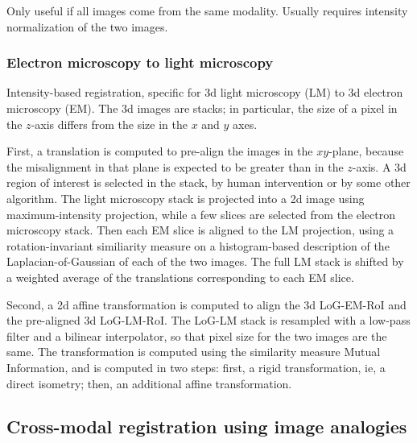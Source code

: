 \documentclass[11pt]{article} %
\begin{document}
Only useful if all images come from the same modality. Usually requires intensity normalization of the two images.
    \subsubsection{Electron microscopy to light microscopy \cite{acosta:intensity}}
Intensity-based registration, specific for 3d light microscopy (LM) to 3d electron microscopy (EM). The 3d images are stacks; in particular, the size of a pixel in the $z$-axis differs from the size in the $x$ and $y$ axes.

First, a translation is computed to pre-align the images in the $xy$-plane, because the misalignment in that plane is expected to be greater than in the $z$-axis. A 3d region of interest is selected in the stack, by human intervention or by some other algorithm. The light microscopy stack is projected into a 2d image using maximum-intensity projection, while a few slices are selected from the electron microscopy stack. Then each EM slice is aligned to the LM projection, using a rotation-invariant similiarity measure on a histogram-based description of the Laplacian-of-Gaussian of each of the two images. The full LM stack is shifted by a weighted average of the translations corresponding to each EM slice.

Second, a 2d affine transformation is computed to align the 3d LoG-EM-RoI and the pre-aligned 3d LoG-LM-RoI. The LoG-LM stack is resampled with a low-pass filter and a bilinear interpolator, so that pixel size for the two images are the same. The transformation is computed using the similarity measure Mutual Information, and is computed in two steps: first, a rigid transformation, ie, a direct isometry; then, an additional affine transformation.

  \subsection{Cross-modal registration using image analogies}
\end{document}
